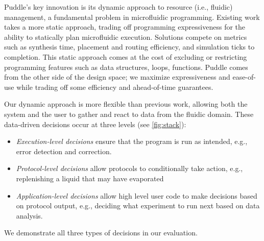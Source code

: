 \documentclass[sigconf, screen]{acmart}
\newcommand\karin[1]{\todo[color=green!80]{\sf #1}}
\begin{document}
Puddle's key innovation is its dynamic approach to resource (i.e., fluidic) management, a fundamental problem in microfluidic programming.
Existing work takes a more static approach, trading off programming expressiveness for the ability to statically plan microfluidic execution.
Solutions compete on metrics such as synthesis time, placement and routing efficiency, and simulation ticks to completion.
This static approach comes at the cost of excluding or restricting programming features such as data structures, loops, functions.
Puddle comes from the other side of the design space; we maximize expressiveness and ease-of-use while trading off some efficiency and ahead-of-time guarantees.


Our dynamic approach is more flexible than previous work, allowing both the system and the user to gather and react to data from the fluidic domain.
These data-driven decisions occur at three levels (see \autoref{fig:stack}):
\begin{itemize}
\item \emph{Execution-level decisions} ensure that the program is run as intended, e.g., error detection and correction.
\item \emph{Protocol-level decisions} allow protocols to conditionally take action, e.g., replenishing a liquid that may have evaporated
\item \emph{Application-level decisions} allow high level user code to make decisions based on protocol output, e.g., deciding what experiment to run next based on data analysis.
\end{itemize}
We demonstrate all three types of decisions in our evaluation.
\end{document}
